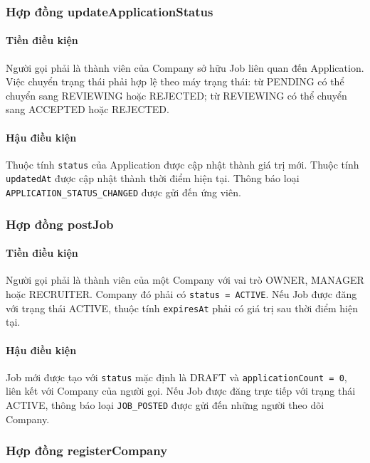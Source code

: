 \subsubsection{Hợp đồng updateApplicationStatus}

\paragraph{Tiền điều kiện}
Người gọi phải là thành viên của Company sở hữu Job liên quan đến Application. Việc chuyển trạng thái phải hợp lệ theo máy trạng thái: từ PENDING có thể chuyển sang REVIEWING hoặc REJECTED; từ REVIEWING có thể chuyển sang ACCEPTED hoặc REJECTED.

\paragraph{Hậu điều kiện}
Thuộc tính \texttt{status} của Application được cập nhật thành giá trị mới. Thuộc tính \texttt{updatedAt} được cập nhật thành thời điểm hiện tại. Thông báo loại \texttt{APPLICATION\_STATUS\_CHANGED} được gửi đến ứng viên.

\subsubsection{Hợp đồng postJob}

\paragraph{Tiền điều kiện}
Người gọi phải là thành viên của một Company với vai trò OWNER, MANAGER hoặc RECRUITER. Company đó phải có \texttt{status = ACTIVE}. Nếu Job được đăng với trạng thái ACTIVE, thuộc tính \texttt{expiresAt} phải có giá trị sau thời điểm hiện tại.

\paragraph{Hậu điều kiện}
Job mới được tạo với \texttt{status} mặc định là DRAFT và \texttt{applicationCount = 0}, liên kết với Company của người gọi. Nếu Job được đăng trực tiếp với trạng thái ACTIVE, thông báo loại \texttt{JOB\_POSTED} được gửi đến những người theo dõi Company.

\subsubsection{Hợp đồng registerCompany}

